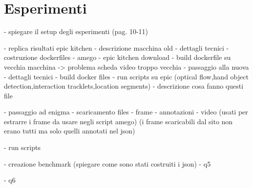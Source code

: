 \chapter{Esperimenti}

- spiegare il setup degli esperimenti (pag. 10-11)

- replica risultati epic kitchen
    - descrizione macchina old
        - dettagli tecnici
    - costruzione dockerfiles
        - amego
        - epic kitchen download
    - build dockerfile su vecchia macchina -> problema scheda video troppo vecchia
    - passaggio alla nuova
        - dettagli tecnici
    - build docker files
    - run scripts su epic (optical flow,hand object detection,interaction tracklets,location segments)
        - descrizione cosa fanno questi file
    

- passaggio ad enigma
    - scaricamento files
        - frame
        - annotazioni
        - video (usati per estrarre i frame da usare negli script amego) (i frame scaricabili dal sito non erano tutti ma solo quelli annotati nel json)

    - run scripts

    - creazione benchmark (spiegare come sono stati costruiti i json)
        - q5

        - q6
    